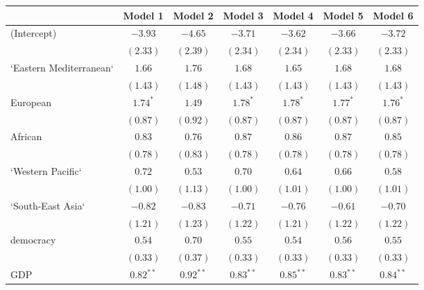 
\begin{table}[!h]
\begin{center}
\begin{tabular}{l c c c c c c }
\toprule
 & Model 1 & Model 2 & Model 3 & Model 4 & Model 5 & Model 6 \\
\midrule
(Intercept)             & $-3.93$      & $-4.65$      & $-3.71$      & $-3.62$      & $-3.66$      & $-3.72$      \\
                        & $(2.33)$     & $(2.39)$     & $(2.34)$     & $(2.34)$     & $(2.33)$     & $(2.33)$     \\
`Eastern Mediterranean` & $1.66$       & $1.76$       & $1.68$       & $1.65$       & $1.68$       & $1.68$       \\
                        & $(1.43)$     & $(1.48)$     & $(1.43)$     & $(1.43)$     & $(1.43)$     & $(1.43)$     \\
European                & $1.74^{*}$   & $1.49$       & $1.78^{*}$   & $1.78^{*}$   & $1.77^{*}$   & $1.76^{*}$   \\
                        & $(0.87)$     & $(0.92)$     & $(0.87)$     & $(0.87)$     & $(0.87)$     & $(0.87)$     \\
African                 & $0.83$       & $0.76$       & $0.87$       & $0.86$       & $0.87$       & $0.85$       \\
                        & $(0.78)$     & $(0.83)$     & $(0.78)$     & $(0.78)$     & $(0.78)$     & $(0.78)$     \\
`Western Pacific`       & $0.72$       & $0.53$       & $0.70$       & $0.64$       & $0.66$       & $0.58$       \\
                        & $(1.00)$     & $(1.13)$     & $(1.00)$     & $(1.01)$     & $(1.00)$     & $(1.01)$     \\
`South-East Asia`       & $-0.82$      & $-0.83$      & $-0.71$      & $-0.76$      & $-0.61$      & $-0.70$      \\
                        & $(1.21)$     & $(1.23)$     & $(1.22)$     & $(1.21)$     & $(1.22)$     & $(1.22)$     \\
democracy               & $0.54$       & $0.70$       & $0.55$       & $0.54$       & $0.56$       & $0.55$       \\
                        & $(0.33)$     & $(0.37)$     & $(0.33)$     & $(0.33)$     & $(0.33)$     & $(0.33)$     \\
GDP                     & $0.82^{**}$  & $0.92^{**}$  & $0.83^{**}$  & $0.85^{**}$  & $0.83^{**}$  & $0.84^{**}$  \\

\end{tabular}
\end{center}
\end{table}
